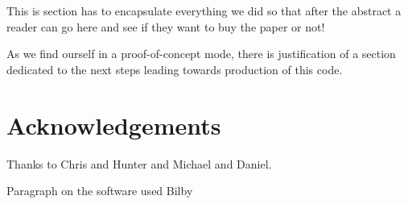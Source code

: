 \documentclass[aps,superscriptaddress,twocolumn,nopreprintnumbers,floatfix,groupedaddress]{revtex4-1}
\newcommand{\bilby}{{\sc Bilby}\xspace}
\begin{document}
This is section has to encapsulate everything we did so that after the abstract a reader can go here and see if they want to buy the paper or not!

As we find ourself in a proof-of-concept mode, there is justification of a section dedicated to the next steps leading towards production of this code.


\section*{Acknowledgements}

Thanks to Chris and Hunter and Michael and Daniel.

Paragraph on the software used \bilby\cite{bilby} 
%
\end{document}
